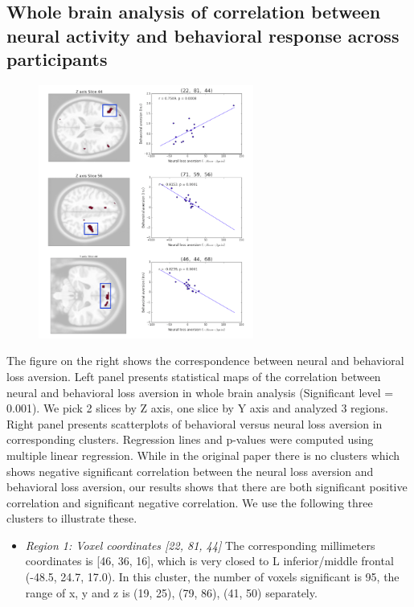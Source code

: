 \documentclass[11pt]{article}
\begin{document}
\newpage

\subsection{Whole brain analysis of correlation between neural activity and behavioral response across participants}

\begin{figure}
  \begin{center}
    \includegraphics[width=0.63\textwidth]{figures/Regression3/corr_neu_bah.png} 
  \end{center}
\end{figure}

The figure on the right shows the correspondence between neural and behavioral loss aversion. Left panel presents statistical maps of the correlation between neural and behavioral loss aversion in whole brain analysis (Significant level = 0.001). We pick 2 slices by Z axis, one slice by Y axis and analyzed 3 regions. Right panel presents scatterplots of behavioral versus neural loss aversion in corresponding clusters. Regression lines and p-values were computed using multiple linear regression. While in the original paper there is no clusters which shows negative significant correlation between the neural loss aversion and behavioral loss aversion, our results shows that there are both significant positive correlation and significant negative correlation. We use the following three clusters to illustrate these.

\begin{itemize}
\item \emph{Region 1: Voxel coordinates [22, 81, 44]} The corresponding millimeters coordinates is [46, 36, 16], which is very closed to L inferior/middle frontal (-48.5, 24.7, 17.0). In this cluster, the number of voxels significant is 95, the range of x, y and z is (19, 25), (79, 86), (41, 50) separately.
\end{itemize}
\end{document}
